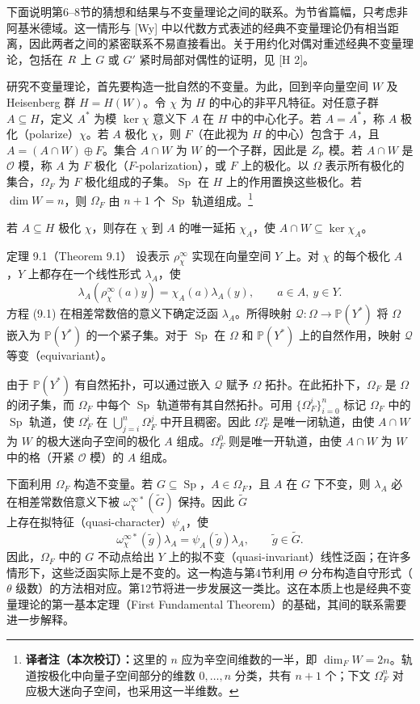 下面说明第6--8节的猜想和结果与不变量理论之间的联系。为节省篇幅，只考虑非阿基米德域。这一情形与 [Wy] 中以代数方式表述的经典不变量理论仍有相当距离，因此两者之间的紧密联系不易直接看出。关于用约化对偶对重述经典不变量理论，包括在 $R$ 上 $G$ 或 $G'$ 紧时局部对偶性的证明，见 [H 2]。

研究不变量理论，首先要构造一批自然的不变量。为此，回到辛向量空间 $W$ 及 Heisenberg 群 $H=H(W)$。令 $\chi$ 为 $H$ 的中心的非平凡特征。对任意子群 $A\subseteq H$，定义 $A^*$ 为模 $\ker\chi$ 意义下 $A$ 在 $H$ 中的中心化子。若 $A=A^*$，称 $A$ 极化（polarize）$\chi$。若 $A$ 极化 $\chi$，则 $F$（在此视为 $H$ 的中心）包含于 $A$，且 $A=(A\cap W)\oplus F$。集合 $A\cap W$ 为 $W$ 的一个子群，因此是 $Z_p$ 模。若 $A\cap W$ 是 $\mathcal O$ 模，称 $A$ 为 $F$ 极化（$F$-polarization），或 $F$ 上的极化。以 $\Omega$ 表示所有极化的集合，$\Omega_F$ 为 $F$ 极化组成的子集。$\operatorname{Sp}$ 在 $H$ 上的作用置换这些极化。若 $\dim W=n$，则 $\Omega_F$ 由 $n+1$ 个 $\operatorname{Sp}$ 轨道组成。\footnote{\textbf{译者注（本次校订）：}这里的 $n$ 应为辛空间维数的一半，即 $\dim_F W=2n$。轨道按极化中向量子空间部分的维数 $0,\ldots,n$ 分类，共有 $n+1$ 个；下文 $\Omega_F^n$ 对应极大迷向子空间，也采用这一半维数。}

若 $A\subseteq H$ 极化 $\chi$，则存在 $\chi$ 到 $A$ 的唯一延拓 $\chi_A$，使 $A\cap W\subseteq\ker\chi_A$。
\begin{originaltheorem}{定理 9.1（Theorem 9.1）}
设表示 $\rho_\chi^\infty$ 实现在向量空间 $Y$ 上。对 $\chi$ 的每个极化 $A$，$Y$ 上都存在一个线性形式 $\lambda_A$，使
\[
\lambda_A(\rho_\chi^\infty(a)y)=\chi_A(a)\lambda_A(y),\qquad a\in A,\ y\in Y.\tag{9.1}
\]
方程 (9.1) 在相差常数倍的意义下确定泛函 $\lambda_A$。所得映射 $\mathcal Q:\Omega\to\mathbb P(Y^*)$ 将 $\Omega$ 嵌入为 $\mathbb P(Y^*)$ 的一个紧子集。对于 $\operatorname{Sp}$ 在 $\Omega$ 和 $\mathbb P(Y^*)$ 上的自然作用，映射 $\mathcal Q$ 等变（equivariant）。
\end{originaltheorem}
由于 $\mathbb P(Y^*)$ 有自然拓扑，可以通过嵌入 $\mathcal Q$ 赋予 $\Omega$ 拓扑。在此拓扑下，$\Omega_F$ 是 $\Omega$ 的闭子集，而 $\Omega_F$ 中每个 $\operatorname{Sp}$ 轨道带有其自然拓扑。可用 $\{\Omega_F^i\}_{i=0}^n$ 标记 $\Omega_F$ 中的 $\operatorname{Sp}$ 轨道，使 $\Omega_F^i$ 在 $\bigcup_{j=i}^n\Omega_F^j$ 中开且稠密。因此 $\Omega_F^n$ 是唯一闭轨道，由使 $A\cap W$ 为 $W$ 的极大迷向子空间的极化 $A$ 组成。$\Omega_F^0$ 则是唯一开轨道，由使 $A\cap W$ 为 $W$ 中的格（开紧 $\mathcal O$ 模）的 $A$ 组成。

下面利用 $\Omega_F$ 构造不变量。若 $G\subseteq\operatorname{Sp}$，$A\in\Omega_F$，且 $A$ 在 $G$ 下不变，则 $\lambda_A$ 必在相差常数倍意义下被 $\omega_\chi^{\infty *}(\widetilde G)$ 保持。因此 $\widetilde G$ 上存在拟特征（quasi-character）$\psi_A$，使
\[
\omega_\chi^{\infty *}(\widetilde g)\lambda_A=\psi_A(\widetilde g)\lambda_A,\qquad\widetilde g\in\widetilde G.\tag{9.2}
\]
因此，$\Omega_F$ 中的 $G$ 不动点给出 $Y$ 上的拟不变（quasi-invariant）线性泛函；在许多情形下，这些泛函实际上是不变的。这一构造与第4节利用 $\Theta$ 分布构造自守形式（$\theta$ 级数）的方法相对应。第12节将进一步发展这一类比。这在本质上也是经典不变量理论的第一基本定理（First Fundamental Theorem）的基础，其间的联系需要进一步解释。

